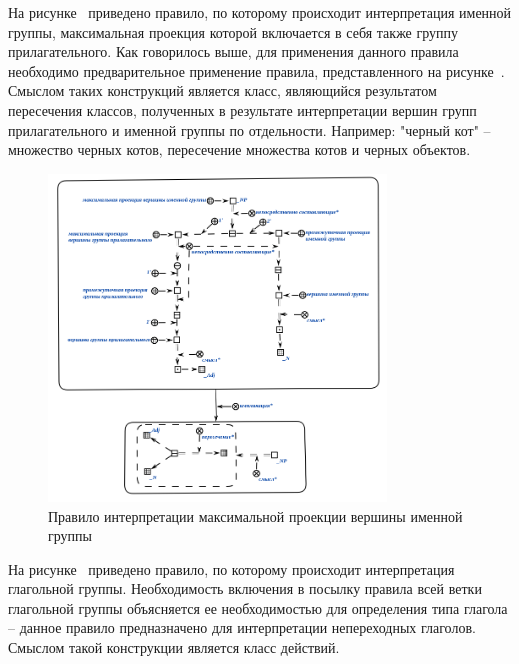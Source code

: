 На рисунке~\textit{} приведено правило, по которому происходит интерпретация именной группы, максимальная проекция которой включается в себя также группу прилагательного.
Как говорилось выше, для применения данного правила необходимо предварительное применение правила, представленного на рисунке~\textit{}.
Смыслом таких конструкций является класс, являющийся результатом пересечения классов, полученных в результате интерпретации вершин групп прилагательного и именной группы по отдельности. Например: "черный кот"{} -- множество черных котов, пересечение множества котов и черных объектов. %

\begin{figure}[h]
    \centering
    \includegraphics[width=0.8\textwidth]{images/part2/chapter_lang/d_sem_2.png}
    \caption{Правило интерпретации максимальной проекции вершины именной группы}
    \label{fig:d_sem_2}
\end{figure}

На рисунке~\textit{} приведено правило, по которому происходит интерпретация глагольной группы. Необходимость включения в посылку правила всей ветки глагольной группы объясняется ее необходимостью для определения типа глагола -- данное правило предназначено для интерпретации непереходных глаголов. Смыслом такой конструкции является класс действий.

